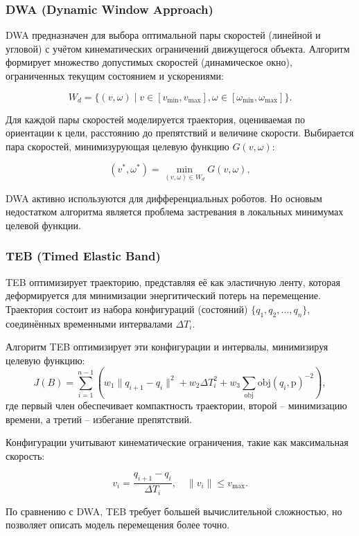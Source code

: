 \subsubsection{DWA (Dynamic Window Approach)}
\hfill
DWA предназначен для выбора оптимальной пары скоростей (линейной и угловой) с учётом кинематических
ограничений движущегося объекта. Алгоритм формирует  множество допустимых скоростей (динамическое окно),
ограниченных текущим состоянием и ускорениями:

\begin{equation}
W_d = \{ (v, \omega) \mid v \in [v_{\min}, v_{\max}],	\omega \in [\omega_{\min}, \omega_{\max}] \}.
\end{equation}

Для каждой пары скоростей моделируется траектория,
оцениваемая по ориентации к цели, расстоянию до препятствий и величине скорости.
Выбирается пара скоростей, минимизурующая целевую функцию $G(v, \omega)$:

\begin{equation}
(v^*, \omega^*) = \min_{(v, \omega) \in W_d} G(v, \omega),
\end{equation}

DWA активно используются для дифференциальных роботов. Но основым недостатком алгоритма
является проблема застревания в локальных минимумах целевой функции.

\subsubsection{TEB (Timed Elastic Band)}
\hfill

TEB оптимизирует траекторию, представляя её как эластичную ленту,
которая деформируется для минимизации энергитический потерь на перемещение.
Траектория состоит из набора конфигураций (состояний) $\{q_1, q_2, \dots, q_n\}$, 
соединённых временными интервалами $\Delta T_i$. 

Алгоритм TEB оптимизирует эти конфигурации и интервалы, минимизируя целевую функцию:
\begin{equation}
	J(B) = \sum_{i=1}^{n-1} \left( w_1 \| q_{i+1} - q_i \|^2 + w_2 \Delta T_i^2 + w_3 \sum_{\text{obj}} \text{obj}(q_i, \text{p})^{-2} \right),
\end{equation}
где первый член обеспечивает компактность траектории, 
второй -- минимизацию времени, 
а третий -- избегание препятствий.

Конфигурации учитывают кинематические ограничения, такие как максимальная скорость:

\begin{equation}
v_i = \frac{q_{i+1} - q_i}{\Delta T_i}, \quad \| v_i \| \leq v_{\max}.
\end{equation}

По сравнению с DWA, TEB требует большей вычислительной сложностью,
но позволяет описать модель перемещения более точно. 
